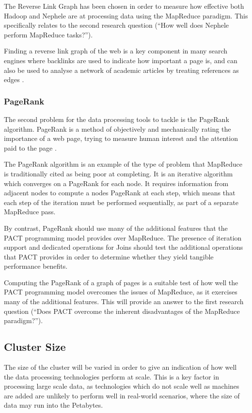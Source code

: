 The Reverse Link Graph has been chosen in order to measure how effective both Hadoop and Nephele are at processing data using the MapReduce paradigm. This specifically relates to the second research question (``How well does Nephele perform MapReduce tasks?'').

Finding a reverse link graph of the web is a key component in many search engines \cite{page1999pagerank} where backlinks are used to indicate how important a page is, and can also be used to analyse a network of academic articles by treating references as edges \cite{garfield2002algorithmic}. 

\subsubsection{PageRank}
The second problem for the data processing tools to tackle is the PageRank algorithm. PageRank is a method of objectively and mechanically rating the importance of a web page, trying to measure human interest and the attention paid to the page \cite{page1999pagerank}. 

The PageRank algorithm is an example of the type of problem that MapReduce is traditionally cited as being poor at completing. It is an iterative algorithm which converges on a PageRank for each node. It requires information from adjacent nodes to compute a nodes PageRank at each step, which means that each step of the iteration must be performed sequentially, as part of a separate MapReduce pass.

By contrast, PageRank should use many of the additional features that the PACT programming model provides over MapReduce. The presence of iteration support and dedicated operations for Joins should test the additional operations that PACT provides in order to determine whether they yield tangible performance benefits.

Computing the PageRank of a graph of pages is a suitable test of how well the PACT programming model overcomes the issues of MapReduce, as it exercises many of the additional features. This will provide an answer to the first research question (``Does PACT overcome the inherent disadvantages of the MapReduce paradigm?'').

\subsection{Cluster Size}
The size of the cluster will be varied in order to give an indication of how well the data processing technologies perform at scale. This is a key factor in processing large scale data, as technologies which do not scale well as machines are added are unlikely to perform well in real-world scenarios, where the size of data may run into the Petabytes.

